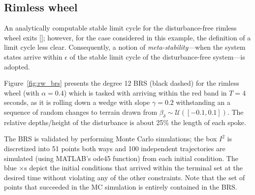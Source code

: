 \subsection{Rimless wheel}
An analytically computable stable limit cycle for the disturbance-free rimless wheel exits []; however, for the case considered in this example, the definition of a limit cycle less clear. Consequently, a notion of {\em meta-stability}---when the system states arrive within $\epsilon$ of the stable limit cycle of the disturbance-free system---is adopted.
\par
Figure~\ref{fig:rw_brs} presents the degree 12 BRS (black dashed) for the rimless wheel (with $\alpha=0.4$) which is tasked with arriving within the red band in $T=4$ seconds, as it is rolling down a wedge with slope $\gamma=0.2$ withstanding an a sequence of random changes to terrain drawn from $\beta_\delta\sim\mathcal U([-0.1,0.1])$. The relative depths/height of the disturbance is about 25\% the length of each spoke.
\par
The BRS is validated by performing Monte Carlo simulations; the box $I^2$ is discretized into 51 points both ways and 100 independent trajectories are simulated (using MATLAB's ode45 function) from each initial condition. The blue $\times$s depict the initial conditions that arrived within the terminal set at the desired time without violating any of the other constraints. Note that the set of points that succeeded in the MC simulation is entirely contained in the BRS.
